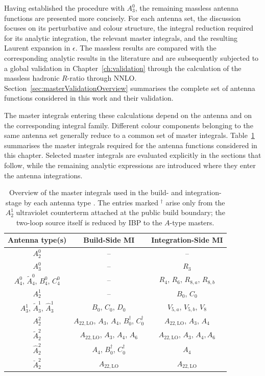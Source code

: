 Having established the procedure with $A_3^0$, the remaining massless antenna functions are
presented more concisely. For each antenna set, the discussion focuses on its perturbative and
colour structure, the integral reduction required for its analytic integration, the relevant master
integrals, and the resulting Laurent expansion in $\epsilon$. The massless results are compared with
the corresponding analytic results in the literature and are subsequently subjected to a global
validation in Chapter~\ref{ch:validation} through the calculation of the massless hadronic $R$-ratio
through NNLO. Section~\ref{sec:masterValidationOverview} summarises the complete set of antenna
functions considered in this work and their validation.

The master integrals entering these calculations depend on the antenna and on the corresponding
integral family. Different colour components belonging to the same antenna set generally reduce to a
common set of master integrals. Table~\ref{tab:MI} summarises the master integrals required for the
antenna functions considered in this chapter. Selected master integrals are evaluated explicitly in
the sections that follow, while the remaining analytic expressions are introduced where they enter
the antenna integrations.

\begin{table}[h!]
\centering
\renewcommand{\arraystretch}{1.3}
  \begin{tabular}{|c|c|c|} 
   \hline
   \textbf{Antenna type(s)} & \textbf{Build-Side MI} & \textbf{Integration-Side MI} \\ 
   \hline
   $A_2^0$ & -- & -- \\ \hline
   $A_3^0$ & -- & $R_3$ \\ \hline
   $A_4^0$, $\tilde A_4^0$, $B_4^0$, $C_4^0$ & -- & $R_4$, $R_6$, $R_{8,a}$, $R_{8,b}$ \\ \hline
   $A_2^1$ & -- & $B_0$, $C_0$ \\ \hline
   $A_3^1$, $\tilde A_3^1$, $\hat A_3^1$ & $B_0$, $C_0$, $D_0$ & $V_{5,a}$, $V_{5,b}$, $V_8$ \\ \hline
   $A_2^2$ & $A_{22,\text{LO}}$, $A_3$, $A_4$, $B_0^\dagger$, $C_0^\dagger$ & $A_{22,\text{LO}}$, $A_3$, $A_4$ \\ \hline
   $\tilde A_2^2$ & $A_{22,\text{LO}}$, $A_3$, $A_4$, $A_6$ & $A_{22,\text{LO}}$, $A_3$, $A_4, A_6$ \\ \hline
   $\hat A_2^2$ & $A_4$, $B_0^\dagger$, $C_0^\dagger$ & $A_4$ \\ \hline
   $\breve A_2^2$ & $A_{22,\text{LO}}$ & $A_{22,\text{LO}}$ \\ \hline
  \end{tabular}
   \caption{Overview of the master integrals used in the build- and integration-stage by each antenna type \cite{Gehrmann-DeRidder:2005btv,GehrmannDeRidder0311276}. The entries marked $^\dagger$ arise only from the $A_2^1$ ultraviolet counterterm attached at the public build boundary; the two-loop source itself is reduced by IBP to the $A$-type masters.}
\label{tab:MI}
\end{table}

